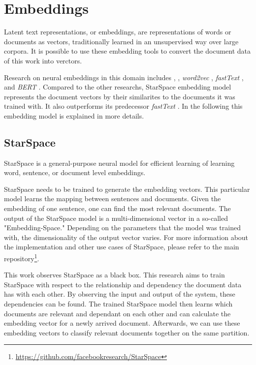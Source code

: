 \section{Embeddings}
\label{sec:embeddings}
Latent text representations, or embeddings, are representations of words or documents as vectors, traditionally learned in an unsupervised way over large corpora. It is possible to use these embedding tools to convert the document data of this work into verctors. 

Research on neural embeddings in this domain includes \cite{bengioNeuralProbabilisticLanguage2003}, 
\cite{collobertNaturalLanguageProcessing2011}, \emph{word2vec} \cite{mikolovEfficientEstimationWord2013}, \emph{fastText} \cite{joulinFastTextZipCompressing2016}, and \emph{BERT} \cite{devlinBERTPretrainingDeep2019}. Compared to the other researchs, StarSpace embedding model represents the document vectors by their similarites to the documents it was trained with. It also outperforms its predecessor \emph{fastText} \cite{wuStarSpaceEmbedAll2017}. In the following this embedding model is explained in more details.

\subsection{StarSpace}
\label{subsec:StarSpace}
StarSpace \cite{wuStarSpaceEmbedAll2017} is a general-purpose neural model for efficient learning of learning word, sentence, or document level embeddings.


StarSpace needs to be trained to generate the embedding vectors. This particular model learns the mapping between sentences and documents. Given the embedding of one sentence, one can find the most relevant documents. The output of the StarSpace model is a multi-dimensional vector in a so-called "Embedding-Space." Depending on the parameters that the model was trained with, the dimensionality of the output vector varies. For more information about the implementation and other use cases of StarSpace, please refer to the main repository\footnote{\url{https://github.com/facebookresearch/StarSpace}}.


This work observes StarSpace as a black box. This research aims to train StarSpace with respect to the relationship and dependency the document data has with each other. By observing the input and output of the system, these dependencies can be found. The trained StarSpace model then learns which documents are relevant and dependant on each other and can calculate the embedding vector for a newly arrived document. Afterwards, we can use these embedding vectors to classify relevant documents together on the same partition.

